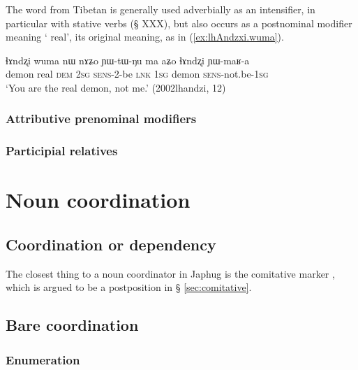 The word  from Tibetan  is generally used adverbially as an intensifier, in particular with stative verbs (§ XXX), but also occurs as a postnominal modifier meaning ` real', its original meaning, as in (\ref{ex:lhAndzxi.wuma}).

\begin{exe}
\ex \label{ex:lhAndzxi.wuma}
\gll ɬɤndʐi wuma nɯ nɤʑo ɲɯ-tɯ-ŋu ma aʑo ɬɤndʐi ɲɯ-maʁ-a \\
demon real \textsc{dem} \textsc{2sg} \textsc{sens}-2-be \textsc{lnk} \textsc{1sg} demon \textsc{sens}-not.be-\textsc{1sg} \\
\glt `You are the real demon, not me.' (2002lhandzi, 12)
\end{exe}


\subsubsection{Attributive prenominal modifiers}

\subsubsection{Participial relatives}

 
 
 \section{Noun coordination}
\subsection{Coordination or dependency} \label{sec:coordinator}
The closest thing to a noun coordinator in Japhug is the comitative marker , which is argued to be a postposition in § \ref{sec:comitative}.

\subsection{Bare coordination}

\subsubsection{Enumeration} \label{sec:noun.enumeration}

